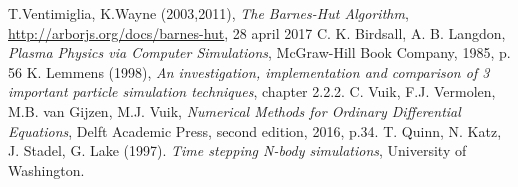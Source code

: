 \begin{thebibliography}{9}
T.Ventimiglia, K.Wayne (2003,2011), \textit{The Barnes-Hut Algorithm}, \url{http://arborjs.org/docs/barnes-hut}, 28 april 2017
C. K. Birdsall, A. B. Langdon, \textit{Plasma Physics via Computer Simulations}, McGraw-Hill Book Company, 1985, p. 56
K. Lemmens (1998), \textit{An investigation, implementation and comparison of 3 important particle simulation techniques}, chapter 2.2.2.
C. Vuik, F.J. Vermolen, M.B. van Gijzen, M.J. Vuik, \textit{Numerical Methods for Ordinary Differential Equations}, Delft Academic Press, second edition, 2016, p.34.
T. Quinn, N. Katz, J. Stadel, G. Lake (1997). \textit{Time stepping N-body simulations}, University of Washington.
\end{thebibliography}

